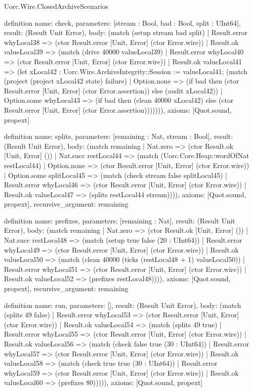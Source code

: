 \begin{lexlean}{Uorc.Wire.ClosedArchiveScenarios}
\begin{semanticmodule}
definition{
  name: check,
  parameters: [stream : Bool, bad : Bool, split : UInt64],
  result: (Result Unit Error),
  body: (match (setup stream bad split)
    | Result.error whyLocal38 => (ctor Result.error [Unit, Error] (ctor Error.wire))
    | Result.ok valueLocal39 => (match (drive 40000 valueLocal39)
      | Result.error whyLocal40 => (ctor Result.error [Unit, Error] (ctor Error.wire))
      | Result.ok valueLocal41 => (let xLocal42 : Uorc.Wire.ArchiveIntegrity::Session := valueLocal41; (match (project (project xLocal42 state) failure)
        | Option.none => (if bad then (ctor Result.error [Unit, Error] (ctor Error.assertion)) else (audit xLocal42))
        | Option.some whyLocal43 => (if bad then (clean 40000 xLocal42) else (ctor Result.error [Unit, Error] (ctor Error.assertion))))))),
  axioms: [Quot.sound, propext]
}

definition{
  name: splits,
  parameters: [remaining : Nat, stream : Bool],
  result: (Result Unit Error),
  body: (match remaining
    | Nat.zero => (ctor Result.ok [Unit, Error] ())
    | Nat.succ restLocal44 => (match (Uorc.Core.Heap::wordOfNat restLocal44)
      | Option.none => (ctor Result.error [Unit, Error] (ctor Error.wire))
      | Option.some splitLocal45 => (match (check stream false splitLocal45)
        | Result.error whyLocal46 => (ctor Result.error [Unit, Error] (ctor Error.wire))
        | Result.ok valueLocal47 => (splits restLocal44 stream)))),
  axioms: [Quot.sound, propext],
  recursive_argument: remaining
}

definition{
  name: prefixes,
  parameters: [remaining : Nat],
  result: (Result Unit Error),
  body: (match remaining
    | Nat.zero => (ctor Result.ok [Unit, Error] ())
    | Nat.succ restLocal48 => (match (setup true false (20 : UInt64))
      | Result.error whyLocal49 => (ctor Result.error [Unit, Error] (ctor Error.wire))
      | Result.ok valueLocal50 => (match (clean 40000 (ticks (restLocal48 + 1) valueLocal50))
        | Result.error whyLocal51 => (ctor Result.error [Unit, Error] (ctor Error.wire))
        | Result.ok valueLocal52 => (prefixes restLocal48)))),
  axioms: [Quot.sound, propext],
  recursive_argument: remaining
}

definition{
  name: run,
  parameters: [],
  result: (Result Unit Error),
  body: (match (splits 49 false)
    | Result.error whyLocal53 => (ctor Result.error [Unit, Error] (ctor Error.wire))
    | Result.ok valueLocal54 => (match (splits 49 true)
      | Result.error whyLocal55 => (ctor Result.error [Unit, Error] (ctor Error.wire))
      | Result.ok valueLocal56 => (match (check false true (30 : UInt64))
        | Result.error whyLocal57 => (ctor Result.error [Unit, Error] (ctor Error.wire))
        | Result.ok valueLocal58 => (match (check true true (30 : UInt64))
          | Result.error whyLocal59 => (ctor Result.error [Unit, Error] (ctor Error.wire))
          | Result.ok valueLocal60 => (prefixes 80))))),
  axioms: [Quot.sound, propext]
}
\end{semanticmodule}
\end{lexlean}

